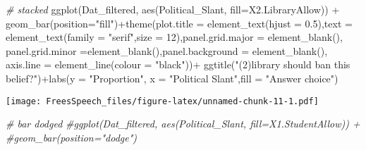 \documentclass[
]{article}
\newenvironment{Shaded}{\begin{snugshade}}{\end{snugshade}}
\newcommand{\AttributeTok}[1]{\textcolor[rgb]{0.77,0.63,0.00}{#1}}
\newcommand{\CommentTok}[1]{\textcolor[rgb]{0.56,0.35,0.01}{\textit{#1}}}
\newcommand{\DecValTok}[1]{\textcolor[rgb]{0.00,0.00,0.81}{#1}}
\newcommand{\FloatTok}[1]{\textcolor[rgb]{0.00,0.00,0.81}{#1}}
\newcommand{\FunctionTok}[1]{\textcolor[rgb]{0.00,0.00,0.00}{#1}}
\newcommand{\NormalTok}[1]{#1}
\newcommand{\SpecialCharTok}[1]{\textcolor[rgb]{0.00,0.00,0.00}{#1}}
\newcommand{\StringTok}[1]{\textcolor[rgb]{0.31,0.60,0.02}{#1}}
\begin{document}
\begin{Shaded}
\begin{Highlighting}[]
\CommentTok{\# stacked}
\FunctionTok{ggplot}\NormalTok{(Dat\_filtered, }\FunctionTok{aes}\NormalTok{(Political\_Slant, }\AttributeTok{fill=}\NormalTok{X2.LibraryAllow)) }\SpecialCharTok{+} 
  \FunctionTok{geom\_bar}\NormalTok{(}\AttributeTok{position=}\StringTok{"fill"}\NormalTok{)}\SpecialCharTok{+}\FunctionTok{theme}\NormalTok{(}\AttributeTok{plot.title =} \FunctionTok{element\_text}\NormalTok{(}\AttributeTok{hjust =} \FloatTok{0.5}\NormalTok{),}\AttributeTok{text =} \FunctionTok{element\_text}\NormalTok{(}\AttributeTok{family =} \StringTok{"serif"}\NormalTok{,}\AttributeTok{size =} \DecValTok{12}\NormalTok{),}\AttributeTok{panel.grid.major =} \FunctionTok{element\_blank}\NormalTok{(), }\AttributeTok{panel.grid.minor =}\FunctionTok{element\_blank}\NormalTok{(),}\AttributeTok{panel.background =} \FunctionTok{element\_blank}\NormalTok{(), }\AttributeTok{axis.line =} \FunctionTok{element\_line}\NormalTok{(}\AttributeTok{colour =} \StringTok{"black"}\NormalTok{))}\SpecialCharTok{+}
\FunctionTok{ggtitle}\NormalTok{(}\StringTok{"(2)library should ban this belief?"}\NormalTok{)}\SpecialCharTok{+}\FunctionTok{labs}\NormalTok{(}\AttributeTok{y =} \StringTok{"Proportion"}\NormalTok{, }\AttributeTok{x =} \StringTok{"Political Slant"}\NormalTok{,}\AttributeTok{fill =} \StringTok{"Answer choice"}\NormalTok{)}
\end{Highlighting}
\end{Shaded}

\texttt{[image: FreesSpeech\_files/figure-latex/unnamed-chunk-11-1.pdf]}

\begin{Shaded}
\begin{Highlighting}[]
\CommentTok{\# bar dodged}
\CommentTok{\#ggplot(Dat\_filtered, aes(Political\_Slant, fill=X1.StudentAllow)) + }
  \CommentTok{\#geom\_bar(position="dodge")}
\end{Highlighting}
\end{Shaded}
\end{document}
